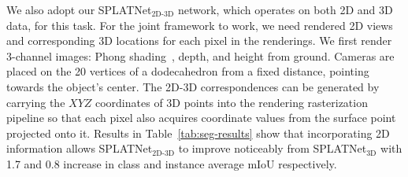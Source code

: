 \documentclass[10pt,twocolumn,letterpaper]{article}
\def\modelthree{SPLATNet$_{\text{3D}}$\xspace}
\def\modeljoint{SPLATNet$_{\text{2D-3D}}$\xspace}
\begin{document}
We also adopt our \modeljoint network, which operates on both 2D and 3D data, for this task.
For the joint framework to work, we need rendered 2D views and corresponding 3D locations for each pixel in the renderings. 
We first render 3-channel images: Phong shading~\cite{Phong:1975:ICG}, depth, and height from ground. Cameras are placed on the 20 vertices of a dodecahedron from a fixed distance, pointing towards the object's center. 
The 2D-3D correspondences can be generated by carrying the $XYZ$ coordinates of 3D points into the rendering rasterization pipeline so that each pixel also acquires coordinate values from the surface point projected onto it. Results in Table~\ref{tab:seg-results} show that incorporating 
2D information allows \modeljoint to improve noticeably from \modelthree with 1.7 and 0.8 increase in class and instance average mIoU respectively. 
\end{document}
